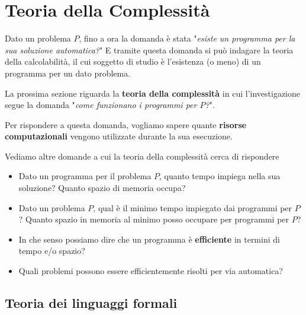 
\chapter{Teoria della Complessità}

Dato un problema $P$, fino a ora la domanda è stata "\textit{esiste un programma per la sua soluzione automatica?}" E tramite questa domanda si può indagare la teoria della calcolabilità, il cui soggetto di studio è l'esistenza (o meno) di un programma per un dato problema.

La prossima sezione riguarda la \textbf{teoria della complessità} in cui l'investigazione segue la domanda "\textit{come funzionano i programmi per $P$?}".

Per rispondere a questa domanda, vogliamo sapere quante \textbf{risorse computazionali} vengono utilizzate durante la sua esecuzione. 

Vediamo altre domande a cui la teoria della complessità cerca di rispondere
\begin{itemize}
	\item Dato un programma per il problema $P$, quanto tempo impiega nella sua soluzione? Quanto spazio di memoria occupa? 

	\item Dato un problema $P$, qual è il minimo tempo impiegato dai programmi per $P$? Quanto spazio in memoria al minimo posso occupare per programmi per $P$? 

	\item In che senso possiamo dire che un programma è \textbf{efficiente} in termini di tempo e/o spazio? 

	\item Quali problemi possono essere efficientemente risolti per via automatica?
\end{itemize}

\section{Teoria dei linguaggi formali}

